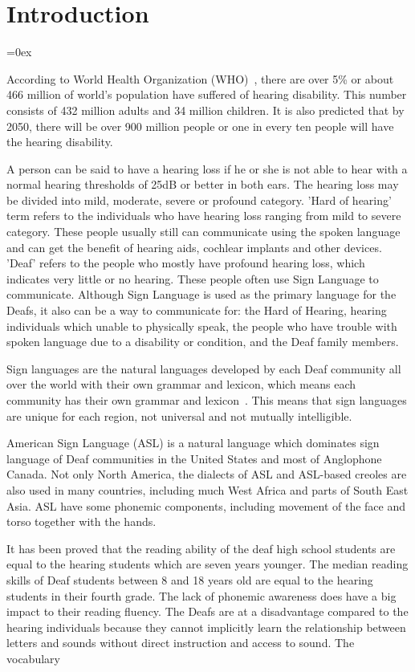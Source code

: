 \chapter{Introduction}
\label{cha:1_introduction} 
\parskip=0ex

According to World Health Organization (WHO)~\cite{deafnessAndHearingLoss}, there are over 5\% or about 466 million of world's population have suffered of hearing disability. This number consists of 432 million adults and 34 million children. It is also predicted that by 2050, there will be over 900 million people or one in every ten people will have the hearing disability.

A person can be said to have a hearing loss if he or she is not able to hear with a normal hearing thresholds of 25dB or better in both ears. The hearing loss may be divided into mild, moderate, severe or profound category. 'Hard of hearing' term refers to the individuals who have hearing loss ranging from mild to severe category. These people usually still can communicate using the spoken language and can get the benefit of hearing aids, cochlear implants and other devices. 'Deaf' refers to the people who mostly have profound hearing loss, which indicates very little or no hearing. These people often use Sign Language to communicate. Although Sign Language is used as the primary language for the Deafs, it also can be a way to communicate for: the Hard of Hearing, hearing individuals which unable to physically speak, the people who have trouble with spoken language due to a disability or condition, and the Deaf family members.

Sign languages are the natural languages developed by each Deaf community all over the world with their own grammar and lexicon, which means each community has their own grammar and lexicon~\cite{WendySandler:2006}. This means that sign languages are unique for each region, not universal and not mutually intelligible.

American Sign Language (ASL) is a natural language which dominates sign language of Deaf communities in the United States and most of Anglophone Canada. Not only North America, the dialects of ASL and ASL-based creoles are also used in many countries, including much West Africa and parts of South East Asia. ASL have some phonemic components, including movement of the face and torso together with the hands.

It has been proved that the reading ability of the deaf high school students are equal to the hearing students which are seven years younger. The median reading skills of Deaf students between 8 and 18 years old are equal to the hearing students in their fourth grade. The lack of phonemic awareness does have a big impact to their reading fluency. The Deafs are at a disadvantage compared to the hearing individuals because they cannot implicitly learn the relationship between letters and sounds without direct instruction and access to sound. The vocabulary 

